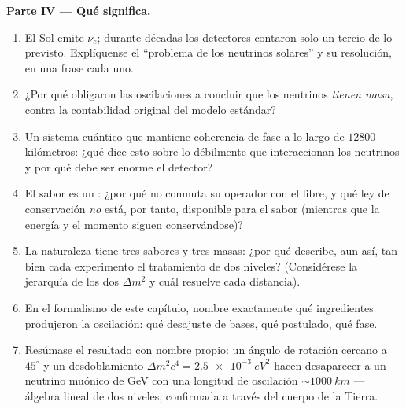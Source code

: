 \begin{problem}
\medskip\noindent\textbf{Parte IV --- Qué significa.}
\begin{enumerate}[resume]
  \item El Sol emite $\nu_e$; durante décadas los detectores contaron solo
        un tercio de lo previsto. Explíquense el ``problema de los neutrinos
        solares'' y su resolución, en una frase cada uno.
  \item ¿Por qué obligaron las oscilaciones a concluir que los neutrinos
        \emph{tienen masa}, contra la contabilidad original del modelo
        estándar?
  \item Un sistema cuántico que mantiene coherencia de fase a lo largo de
        $12800$ kilómetros: ¿qué dice esto sobre lo débilmente que
        interaccionan los neutrinos y por qué debe ser enorme el detector?
  \item El sabor es un : ¿por qué no conmuta su operador con el
         libre, y qué ley de conservación \emph{no} está, por
        tanto, disponible para el sabor (mientras que la energía y el
        momento siguen conservándose)?
  \item La naturaleza tiene tres sabores y tres masas: ¿por qué describe,
        aun así, tan bien cada experimento el tratamiento de dos niveles?
        (Considérese la jerarquía de los dos $\Delta m^2$ y cuál resuelve
        cada distancia).
  \item En el formalismo de este capítulo, nombre exactamente qué
        ingredientes produjeron la oscilación: qué desajuste de bases, qué
        postulado, qué fase.
  \item Resúmase el resultado con nombre propio: un ángulo de rotación
        cercano a $45^\circ$ y un desdoblamiento $\Delta m^2c^4 =
        \qty{2.5e-3}{eV^2}$ hacen desaparecer a un neutrino muónico de GeV
        con una longitud de oscilación $\sim\qty{1000}{km}$ --- álgebra
        lineal de dos niveles, confirmada a través del cuerpo de la Tierra.
\end{enumerate}
\end{problem}
